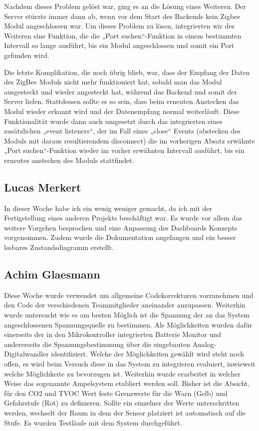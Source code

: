 \documentclass[]{article}
\begin{document}
Nachdem dieses Problem gelöst war, ging es an die Lösung eines Weiteren. Der Server stürzte immer dann ab, wenn vor dem Start des Backends kein Zigbee Modul angeschlossen war. Um dieses Problem zu lösen, integrierten wir des Weiteren eine Funktion, die die „Port suchen“-Funktion in einem bestimmten Intervall so lange ausführt, bis ein Modul angeschlossen und somit ein Port gefunden wird.

Die letzte Komplikation, die noch übrig blieb, war, dass der Empfang der Daten des ZigBee Moduls nicht mehr funktioniert hat, sobald man das Modul ausgesteckt und wieder angesteckt hat, während das Backend und somit der Server liefen. Stattdessen sollte es so sein, dass beim erneuten Anstecken das Modul wieder erkannt wird und der Datenempfang normal weiterläuft. Diese Funktionalität wurde dann auch umgesetzt durch das integrierten eines zusätzlichen „event listeners“, der im Fall eines „close“ Events (abstecken des Moduls mit daraus resultierendem disconnect) die im vorherigen Absatz erwähnte „Port suchen“-Funktion wieder im vorher erwähnten Intervall ausführt, bis ein erneutes anstecken des Moduls stattfindet.


\subsection{Lucas Merkert}
In dieser Woche habe ich ein wenig weniger gemacht, da ich mit der Fertigstellung eines anderen Projekts beschäftigt war. Es wurde vor allem das weitere Vorgehen besprochen und eine Anpassung des Dashboards Konzepts vorgenommen. Zudem wurde die Dokumentation angefangen und ein besser lesbares Zustandsdiagramm erstellt.

\subsection{Achim Glaesmann}
Diese Woche wurde verwendet um allgemeine Codekorrekturen vorzunehmen und den Code der verschiedenen Teammitglieder aneinander anzupassen. Weiterhin wurde untersucht wie es am besten Möglich ist die Spannung der an das System angeschlossenen Spannungsquelle zu bestimmen. Als Möglichkeiten wurden dafür einerseits der in den Mikrokontroller integrierten Batterie Monitor und andererseits die Spannungsbestimmung über die eingebauten Analog-Digitalwandler identifiziert. Welche der Möglichkeiten gewählt wird steht noch offen, es wird beim Versuch diese in das System zu integrieren evaluiert, inwieweit welche Möglichkeite zu bevorzugen ist. Weiterhin wurde erarbeitet in welcher Weise das sogenannte Ampelsystem etabliert werden soll. Bisher ist die Absicht, für den CO2 und TVOC Wert feste Grenzwerte für die Warn (Gelb) und Gefahrstufe (Rot) zu definieren. Sollte ein einzelner der Werte unterschritten werden, wechselt der Raum in dem der Sensor platziert ist automatisch auf die Stufe. Es wurden Testläufe mit dem System durchgeführt.
\end{document}
